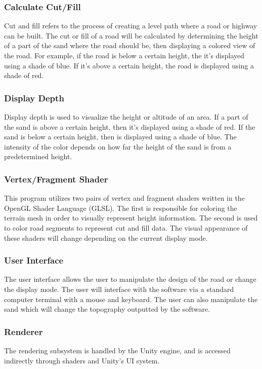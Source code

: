 \documentclass[onecolumn, draftclsnofoot,10pt, compsoc]{IEEEtran}
\begin{document}
\subsubsection{Calculate Cut/Fill} %
Cut and fill refers to the process of creating a level path where a road or highway can be built.
The cut or fill of a road will be calculated by determining the height of a part of the sand where the road should be, then displaying a colored view of the road.
For example, if the road is below a certain height, the it's displayed using a shade of blue.
If it's above a certain height, the road is displayed using a shade of red.

\subsubsection{Display Depth} %
Display depth is used to visualize the height or altitude of an area.
If a part of the sand is above a certain height, then it's displayed using a shade of red.
If the sand is below a certain height, then is displayed using a shade of blue.
The intensity of the color depends on how far the height of the sand is from a predetermined height.

\subsubsection{Vertex/Fragment Shader} %
This program utilizes two pairs of vertex and fragment shaders written in the OpenGL Shader Language (GLSL). 
The first is responsible for coloring the terrain mesh in order to visually represent height information. 
The second is used to color road segments to represent cut and fill data. 
The visual appearance of these shaders will change depending on the current display mode.

\subsubsection{User Interface} %
The user interface allows the user to manipulate the design of the road or change the display mode.
The user will interface with the software via a standard computer terminal with a mouse and keyboard.
The user can also manipulate the sand which will change the topography outputted by the software.

\subsubsection{Renderer}  %
The rendering subsystem is handled by the Unity engine, and is accessed indirectly through shaders and Unity's UI system.
\end{document}

